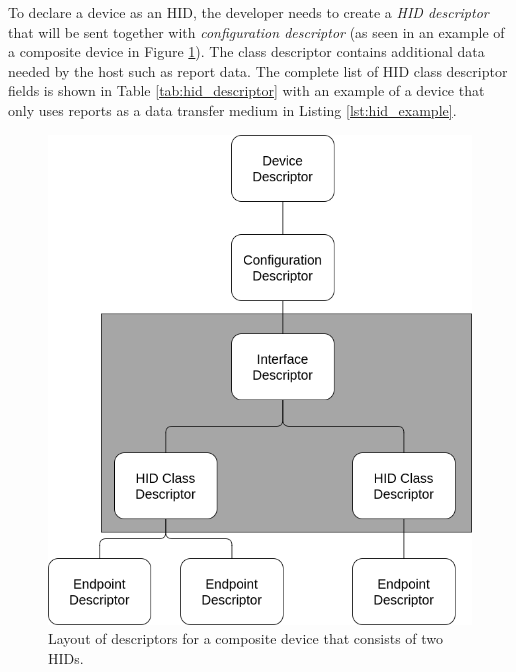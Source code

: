 To declare a device as an HID, the developer needs to create a \emph{HID descriptor} that will be sent together with \emph{configuration descriptor} (as seen in an example of a composite device in Figure \ref{fig:hid_compose}). The class descriptor contains additional data needed by the host such as report data. The complete list of HID class descriptor fields is shown in Table \ref{tab:hid_descriptor} with an example of a device that only uses reports as a data transfer medium in Listing \ref{lst:hid_example}.

\begin{figure}[ht]
    \centering
    \includegraphics[width=0.5\linewidth]{obrazky-figures/hid_descriptor.png}
    \caption{Layout of descriptors for a composite device that consists of two HIDs.}
    \label{fig:hid_compose}
\end{figure}

